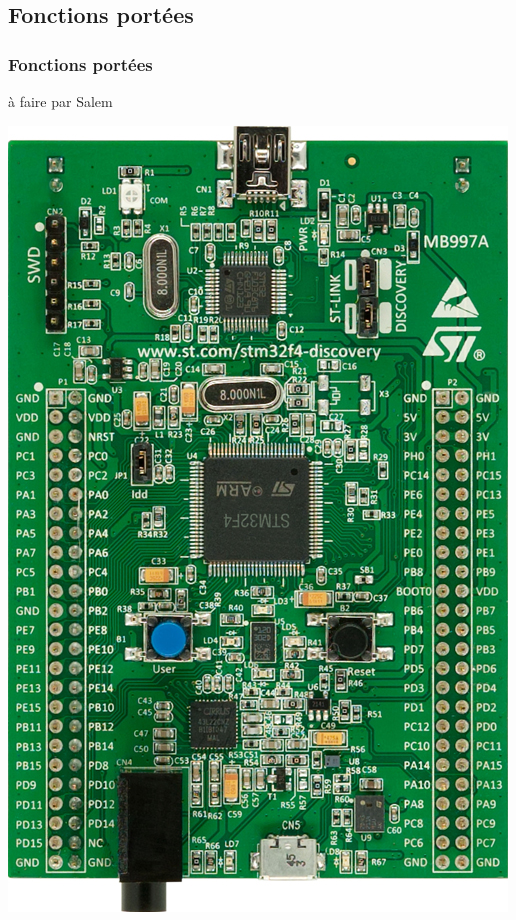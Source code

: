 \documentclass{beamer}
\begin{document}
\subsection{Fonctions portées}
\begin{frame}
\frametitle{Fonctions portées}
à faire par Salem
\begin{center}
 \includegraphics[scale=0.1]{../images/stm32f4_discovery.jpg}
\end{center}
\end{frame}
\end{document}
